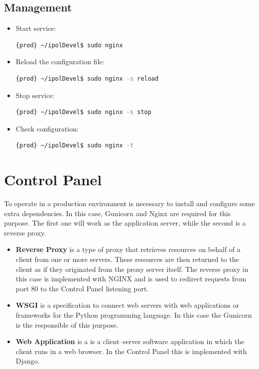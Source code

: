 \documentclass[a4paper,12pt]{article}
\begin{document}
\subsection{Management}

\begin{itemize}
    \item Start service:
    \begin{lstlisting}[language=Bash]
    {prod} ~/ipolDevel$ sudo nginx
    \end{lstlisting}
    \item Reload the configuration file:
    \begin{lstlisting}[language=Bash]
    {prod} ~/ipolDevel$ sudo nginx -s reload
    \end{lstlisting}
    \item Stop service:
    \begin{lstlisting}[language=Bash]
    {prod} ~/ipolDevel$ sudo nginx -s stop
    \end{lstlisting}
    \item Check configuration:
    \begin{lstlisting}[language=Bash]
    {prod} ~/ipolDevel$ sudo nginx -t
    \end{lstlisting}
\end{itemize}


\section{Control Panel}
To operate in a production environment is necessary to install and configure some extra dependencies. In this case, Gunicorn and Nginx are
required for this purpose. The first one will work as the application server, while the second is a reverse proxy.

\begin{itemize}
    \item \textbf{Reverse Proxy} is a type of proxy that retrieves resources on behalf of a client from one or more servers.
    These resources are then returned to the client as if they originated from the proxy server itself. The reverse proxy in this case is
    implemented with NGINX and is used to redirect requests from port 80 to the Control Panel listening port.
    \item \textbf{WSGI} is a specification to connect web servers with web applications or frameworks for the Python programming language.
    In this case the Gunicorn is the responsible of this purpose.
    \item \textbf{Web Application} is a is a client–server software application in which the client runs in a web browser. In the Control Panel this
    is implemented with Django.
\end{itemize}
\end{document}
